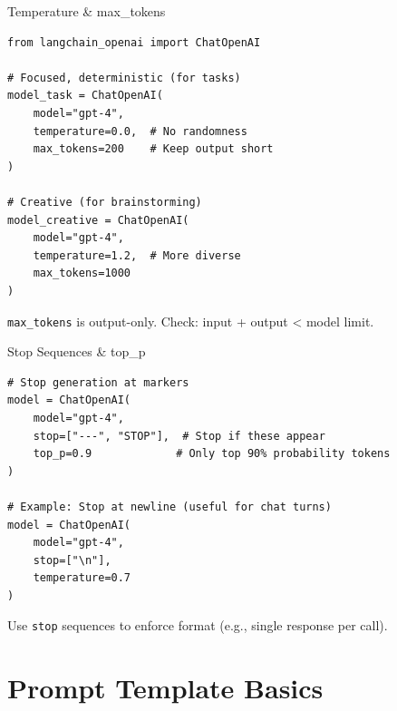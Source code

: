 \documentclass[aspectratio=169,11pt]{beamer}
\begin{document}
\begin{frame}[fragile,shrink=5]{Temperature \& max\_tokens}
  \begin{codebox}
    \begin{lstlisting}
from langchain_openai import ChatOpenAI

# Focused, deterministic (for tasks)
model_task = ChatOpenAI(
    model="gpt-4",
    temperature=0.0,  # No randomness
    max_tokens=200    # Keep output short
)

# Creative (for brainstorming)
model_creative = ChatOpenAI(
    model="gpt-4",
    temperature=1.2,  # More diverse
    max_tokens=1000
)
    \end{lstlisting}
  \end{codebox}
  \vspace{-0.1cm}
  \begin{warningbox}
    \texttt{max\_tokens} is output-only. Check: input + output < model limit.
  \end{warningbox}
\end{frame}

\begin{frame}[fragile]{Stop Sequences \& top\_p}
  \begin{codebox}
    \begin{lstlisting}
# Stop generation at markers
model = ChatOpenAI(
    model="gpt-4",
    stop=["---", "STOP"],  # Stop if these appear
    top_p=0.9             # Only top 90% probability tokens
)

# Example: Stop at newline (useful for chat turns)
model = ChatOpenAI(
    model="gpt-4",
    stop=["\n"],
    temperature=0.7
)
    \end{lstlisting}
  \end{codebox}

  \vspace{0.08cm}
  \begin{tipbox}
    Use \texttt{stop} sequences to enforce format (e.g., single response per call).
  \end{tipbox}
\end{frame}

\section{Prompt Template Basics}
\end{document}
